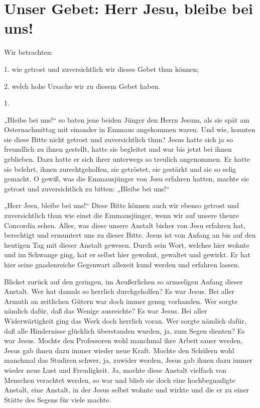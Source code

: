 \section{Unser Gebet: Herr Jesu, bleibe bei uns!}

Wir betrachten:

1. wie getrost und zuversichtlich wir dieses Gebet thun können;

2. welch hohe Ursache wir zu diesem Gebet haben.

1.

„Bleibe bei uns!“ so baten jene beiden Jünger den Herrn Jesum, als sie spät am Osternachmittag mit einander in Emmaus angekommen waren. Und wie, konnten sie diese Bitte nicht getrost und zuversichtlich thun? Jesus hatte sich ja so freundlich zu ihnen gestellt, hatte sie begleitet und war bis jetzt bei ihnen geblieben. Dazu hatte er sich ihrer unterwegs so treulich angenommen. Er hatte sie belehrt, ihnen zurechtgeholfen, sie getröstet, sie gestärkt und sie so selig gemacht. O gewiß, was die Emmausjünger von Jesu erfahren hatten, machte sie getrost und zuversichtlich zu bitten: „Bleibe bei uns!“

„Herr Jesu, bleibe bei uns!“ Diese Bitte können auch wir ebenso getrost und zuversichtlich thun wie einst die Emmausjünger, wenn wir auf unsere theure Concordia sehen. Alles, was diese unsere Anstalt bisher von Jesu erfahren hat, berechtigt und ermuntert uns zu dieser Bitte. Jesus ist von Anfang an bis auf den heutigen Tag mit dieser Anstalt gewesen. Durch sein Wort, welches hier wohnte und im Schwange ging, hat er selbst hier gewohnt, gewaltet und gewirkt. Er hat hier seine gnadenreiche Gegenwart allezeit kund werden und erfahren lassen.

Blicket zurück auf den geringen, im Aeußerlichen so armseligen Anfang dieser Anstalt. Wer hat damals so herrlich durchgeholfen? Es war Jesus. Bei aller Armuth an zeitlichen Gütern war doch immer genug vorhanden. Wer sorgte nämlich dafür, daß das Wenige ausreichte? Es war Jesus. Bei aller Widerwärtigkeit ging das Werk doch herrlich voran. Wer sorgte nämlich dafür, daß alle Hindernisse glücklich überstanden wurden, ja, zum Segen dienten? Es war Jesus. Mochte den Professoren wohl manchmal ihre Arbeit sauer werden, Jesus gab ihnen dazu immer wieder neue Kraft. Mochte den Schülern wohl manchmal das Studiren schwer, ja, zuwider werden, Jesus gab ihnen dazu immer wieder neue Lust und Freudigkeit. Ja, mochte diese Anstalt vielfach von Menschen verachtet werden, so war und blieb sie doch eine hochbegnadigte Anstalt, eine Anstalt, in der Jesus selbst wohnte und wirkte und die er zu einer Stätte des Segens für viele machte.

